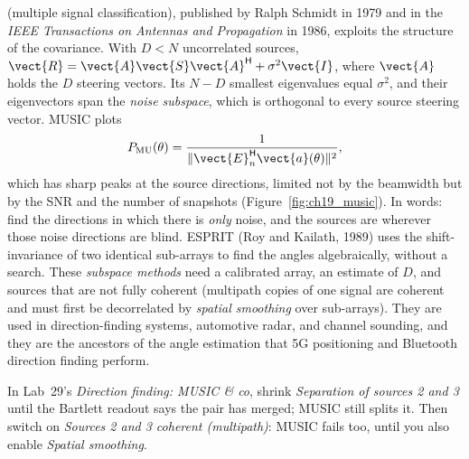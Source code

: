  (multiple signal classification), published by Ralph Schmidt in 1979 and in the
\emph{IEEE Transactions on Antennas and Propagation} in 1986, exploits the structure of the
covariance. With $D<N$ uncorrelated sources,
$\vect{R}=\vect{A}\vect{S}\vect{A}^{\mathsf H}+\sigma^2\vect{I}$, where $\vect{A}$ holds the $D$ steering
vectors. Its $N-D$ smallest eigenvalues equal $\sigma^2$, and their eigenvectors span the \emph{noise
subspace}, which is orthogonal to every source steering vector. MUSIC plots
\begin{equation}
P_{\text{MU}}(\theta)=\frac{1}{\|\vect{E}_n^{\mathsf H}\vect{a}(\theta)\|^2},
\end{equation}
which has sharp peaks at the source directions, limited not by the beamwidth but by the SNR and the
number of snapshots (Figure~\ref{fig:ch19_music}). In words: find the directions in which there is
\emph{only} noise, and the sources are wherever those noise directions are blind. ESPRIT (Roy and
Kailath, 1989) uses the shift-invariance of two identical sub-arrays to find the angles
algebraically, without a search. These \emph{subspace methods} need a calibrated array, an estimate
of $D$, and sources that are not fully coherent (multipath copies of one signal are coherent and
must first be decorrelated by \emph{spatial smoothing} over sub-arrays). They are used in
direction-finding systems, automotive radar, and channel sounding, and they are the ancestors of
the angle estimation that 5G positioning and Bluetooth direction finding perform.

\begin{tryit}
In Lab~29's \emph{Direction finding: MUSIC \& co}, shrink \emph{Separation of sources 2 and 3}
until the Bartlett readout says the pair has merged; MUSIC still splits it. Then switch on
\emph{Sources 2 and 3 coherent (multipath)}: MUSIC fails too, until you also enable \emph{Spatial
smoothing}.
\end{tryit}

